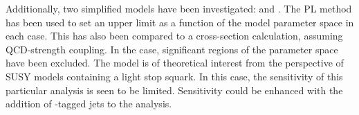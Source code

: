 Additionally, two simplified models have been investigated: \TthreeW and
\Ttwott. The \ac{PL} method has been used to set an upper limit as a function of
the model parameter space in each case. This has also been compared to a
cross-section calculation, assuming \ac{QCD}-strength coupling. In the \TthreeW
case, significant regions of the parameter space have been excluded. The \Ttwott
model is of theoretical interest from the perspective of \ac{SUSY} models
containing a light stop squark. In this case, the sensitivity of this particular
analysis is seen to be limited. Sensitivity could be enhanced with the addition
of \Pbottom-tagged jets to the analysis.



